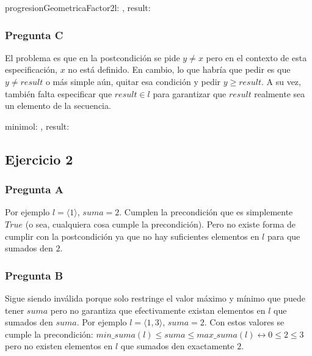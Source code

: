 \begin{proc}{progresionGeometricaFactor2}{\In l: \TLista{\ent}, \Out result: \bool}{}
\end{proc}

\subsubsection{Pregunta C}

El problema es que en la postcondición se pide $y \neq x$ pero en el contexto de esta especificación, $x$ no está definido. En cambio, lo que habría que pedir es que $y \neq result$ o más simple aún, quitar esa condición y pedir $y \geq result$. A su vez, también falta especificar que $result \in l$ para garantizar que $result$ realmente sea un elemento de la secuencia.

\begin{proc}{minimo}{\In l: \TLista{\ent}, \Out result: \ent}{}
\end{proc}

\subsection{Ejercicio 2}

\subsubsection{Pregunta A}

Por ejemplo $l = \langle 1 \rangle$, $suma = 2$. Cumplen la precondición que es simplemente $True$ (o sea, cualquiera cosa cumple la precondición). Pero no existe forma de cumplir con la postcondición ya que no hay suficientes elementos en $l$ para que sumados den $2$.

\subsubsection{Pregunta B}

Sigue siendo inválida porque solo restringe el valor máximo y mínimo que puede tener $suma$ pero no garantiza que efectivamente existan elementos en $l$ que sumados den $suma$. Por ejemplo $l = \langle 1, 3 \rangle$, $suma = 2$. Con estos valores se cumple la precondición: $min\_suma(l) \leq suma \leq max\_suma(l) \leftrightarrow 0 \leq 2 \leq 3$ pero no existen elementos en $l$ que sumados den exactamente $2$.

